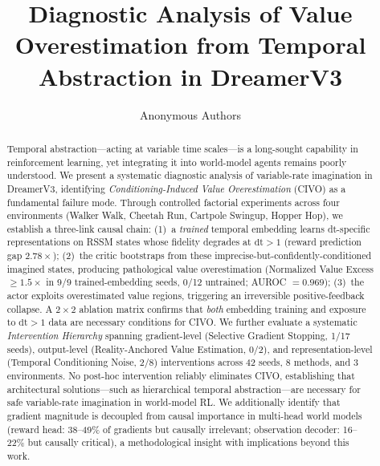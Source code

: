 \documentclass[10pt,letterpaper]{article}
\title{Diagnostic Analysis of Value Overestimation from Temporal Abstraction in DreamerV3}
\author{
Anonymous Authors
}
\date{}
\begin{document}
\maketitle

\begin{abstract}
Temporal abstraction---acting at variable time scales---is a long-sought capability in reinforcement learning, yet integrating it into world-model agents remains poorly understood.
We present a systematic diagnostic analysis of variable-rate imagination in DreamerV3, identifying \emph{Conditioning-Induced Value Overestimation} (CIVO) as a fundamental failure mode.
Through controlled factorial experiments across four environments (Walker Walk, Cheetah Run, Cartpole Swingup, Hopper Hop), we establish a three-link causal chain: (1)~a \emph{trained} temporal embedding learns dt-specific representations on RSSM states whose fidelity degrades at $\mathrm{dt}>1$ (reward prediction gap $2.78\times$); (2)~the critic bootstraps from these imprecise-but-confidently-conditioned imagined states, producing pathological value overestimation (Normalized Value Excess $\geq 1.5\times$ in 9/9 trained-embedding seeds, 0/12 untrained; AUROC $= 0.969$); (3)~the actor exploits overestimated value regions, triggering an irreversible positive-feedback collapse.
A $2\times 2$ ablation matrix confirms that \emph{both} embedding training and exposure to $\mathrm{dt}>1$ data are necessary conditions for CIVO.
We further evaluate a systematic \emph{Intervention Hierarchy} spanning gradient-level (Selective Gradient Stopping, 1/17 seeds), output-level (Reality-Anchored Value Estimation, 0/2), and representation-level (Temporal Conditioning Noise, 2/8) interventions across 42 seeds, 8 methods, and 3 environments.
No post-hoc intervention reliably eliminates CIVO, establishing that architectural solutions---such as hierarchical temporal abstraction---are necessary for safe variable-rate imagination in world-model RL.
We additionally identify that gradient magnitude is decoupled from causal importance in multi-head world models (reward head: 38--49\% of gradients but causally irrelevant; observation decoder: 16--22\% but causally critical), a methodological insight with implications beyond this work.
\end{abstract}

\end{document}
